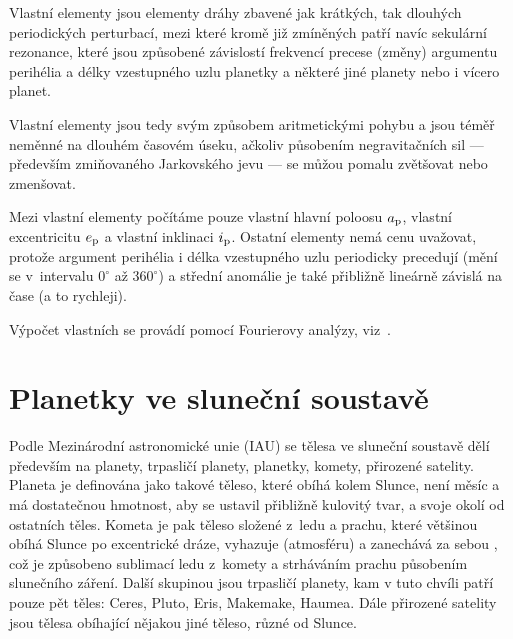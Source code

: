 \documentclass[A4paper, 12pt, oneside]{book}
\begin{document}
Vlastní elementy jsou elementy dráhy zbavené jak krátkých, tak dlouhých periodických perturbací, mezi které kromě již zmíněných patří navíc sekulární rezonance, které jsou způsobené závislostí frekvencí precese (změny) argumentu perihélia a délky vzestupného uzlu planetky a některé jiné planety nebo i vícero planet.

Vlastní elementy jsou tedy svým způsobem aritmetickými  pohybu a jsou téměř neměnné na dlouhém časovém úseku, ačkoliv působením negravitačních sil --- především zmiňovaného Jarkovského jevu --- se můžou pomalu zvětšovat nebo zmenšovat. 

Mezi vlastní elementy počítáme pouze vlastní hlavní poloosu $a_{\rm p}$, vlastní excentricitu $e_{\rm p}$ a vlastní inklinaci $i_{\rm p}$. Ostatní elementy nemá cenu uvažovat, protože argument perihélia i délka vzestupného uzlu periodicky precedují (mění se v~intervalu $0^\circ$ až $360^\circ$) a střední anomálie je také přibližně lineárně závislá na čase (a to rychleji).

Výpočet vlastních se provádí pomocí Fourierovy analýzy, viz~\cite{sidlichovsky96}. 

\chapter{Planetky ve sluneční soustavě}


Podle Mezinárodní astronomické unie (IAU) se tělesa ve sluneční soustavě dělí především na planety, trpasličí planety, planetky, komety, přirozené satelity. Planeta je definována jako takové těleso, které obíhá kolem Slunce, není měsíc a má dostatečnou hmotnost, aby se ustavil přibližně kulovitý tvar, a  svoje okolí od ostatních těles. Kometa je pak těleso složené z~ledu a prachu, které většinou obíhá Slunce po excentrické dráze, vyhazuje  (atmosféru) a zanechává za sebou , což je způsobeno sublimací ledu z~komety a strháváním prachu působením slunečního záření. Další skupinou jsou trpasličí planety, kam v tuto chvíli patří pouze pět těles: Ceres, Pluto, Eris, Makemake, Haumea. Dále přirozené satelity jsou tělesa obíhající nějakou jiné těleso, různé od Slunce.
\end{document}
